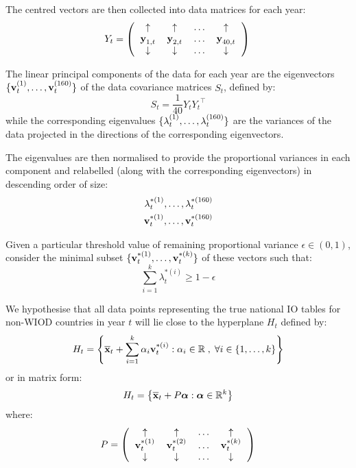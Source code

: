 \documentclass[preprint,authoryear,3p]{elsarticle}
\begin{document}
The centred vectors are then collected into data matrices for each year:
\begin{equation*}
Y_t = \left(
\begin{tabular}{cccc}
$\uparrow$ & $\uparrow$ & $\mathellipsis$ & $\uparrow$\\
$\textbf{y}_{1,t}$ & $\textbf{y}_{2,t}$ & $\mathellipsis$ & $\textbf{y}_{40,t}$ \\
$\downarrow$ & $\downarrow$ & $\mathellipsis$ & $\downarrow$
\end{tabular} \right) \\
\end{equation*}

The linear principal components of the data for each year are the eigenvectors $\{ \textbf{v}_{t}^{(1)} , \mathellipsis , \textbf{v}_{t}^{(160)} \}$ of the data covariance matrices $S_t$, defined by:
$$ S_t = \frac{1}{40} Y_t {Y_t}^\top $$
while the corresponding eigenvalues $\{ \lambda_t^{(1)} , \mathellipsis , \lambda_t^{(160)} \}$ are the variances of the data projected in the directions of the corresponding eigenvectors.

The eigenvalues are then normalised to provide the proportional variances in each component and relabelled (along with the corresponding eigenvectors) in descending order of size:
\begin{align*}
\lambda_t^{*(1)} , \mathellipsis , \lambda_t^{*(160)} \\
\textbf{v}_{t}^{*(1)} , \mathellipsis , \textbf{v}_{t}^{*(160)}
\end{align*}

Given a particular threshold value of remaining proportional variance $\epsilon \in (0,1)$, consider the minimal subset $\{ \textbf{v}_{t}^{*(1)} , \mathellipsis , \textbf{v}_{t}^{*(k)} \}$ of these vectors such that:
$$ \displaystyle \sum_{i = 1}^{k} \lambda_t^{*(i)} \geq 1 - \epsilon $$

We hypothesise that all data points representing the true national IO tables for non-WIOD countries in year $t$ will lie close to the hyperplane $H_{t}$ defined by:
$$
H_{t} = \left\{ \overline{\textbf{x}}_{t} + \displaystyle \sum_{i = 1}^{k} \alpha_i \textbf{v}_{t}^{*(i)} : \alpha_i \in \mathbb{R} \; , \; \forall i \in \{ 1 , \mathellipsis , k \} \right\}
$$
or in matrix form:
$$
H_t = \left\{ \overline{\textbf{x}}_t + P \mbox{\boldmath$\alpha$} : \mbox{\boldmath$\alpha$} \in \mathbb{R}^{k} \right\}
$$
where:
\begin{equation*}
P = \left(
\begin{tabular}{cccc}
$\uparrow$ & $\uparrow$ & $\mathellipsis$ & $\uparrow$\\
$\textbf{v}_{t}^{*(1)}$ & $\textbf{v}_{t}^{*(2)}$ & $\mathellipsis$ & $\textbf{v}_{t}^{*(k)}$ \\
$\downarrow$ & $\downarrow$ & $\mathellipsis$ & $\downarrow$
\end{tabular} \right)
\end{equation*}
\end{document}
